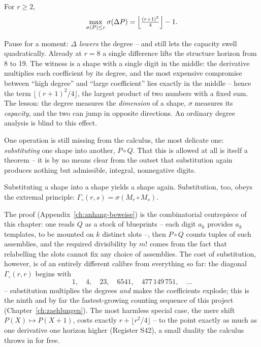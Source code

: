\begin{satz}
For $r\ge2$,
\[
\max_{\sigma(P)\le r}\sigma(\Delta P)
=\Bigl\lfloor\tfrac{(r+1)^2}{4}\Bigr\rfloor-1 .
\]
\end{satz}

Pause for a moment: $\Delta$ \emph{lowers} the degree -- and still
lets the capacity swell quadratically. Already at $r=8$ a single
difference lifts the structure horizon from 8 to 19. The witness
is a shape with a single digit in the middle: the derivative
multiplies each coefficient by its degree, and the most expensive
compromise between ``high degree'' and ``large coefficient'' lies
exactly in the middle -- hence the term
$\lfloor(r{+}1)^2/4\rfloor$, the largest product of two numbers
with a fixed sum. The lesson: the degree measures the
\emph{dimension} of a shape, $\sigma$ measures its
\emph{capacity}, and the two can jump in opposite directions. An
ordinary degree analysis is blind to this effect.

One operation is still missing from the calculus, the most
delicate one: \emph{substituting} one shape into another,
$P\circ Q$. That this is allowed at all is itself a theorem -- it
is by no means clear from the outset that substitution again
produces nothing but admissible, integral, nonnegative digits.

\begin{satz}
Substituting a shape into a shape yields a shape again.
Substitution, too, obeys the extremal principle:
$\Gamma_\circ(r,s)=\sigma(M_r\circ M_s)$.
\end{satz}

The proof (Appendix~\ref{ch:anhang-beweise}) is the combinatorial
centrepiece of this chapter: one reads $Q$ as a stock of
blueprints -- each digit $a_k$ provides $a_k$ templates, to be
mounted on $k$ distinct slots --, then $P\circ Q$ counts tuples
of such assemblies, and the required divisibility by $m!$ comes
from the fact that relabelling the slots cannot fix any choice of
assemblies. The cost of substitution, however, is of an entirely
different calibre from everything so far: the diagonal
$\Gamma_\circ(r,r)$ begins with
\[
1,\quad 4,\quad 23,\quad 6541,\quad 477\,149\,751,\quad\ldots
\]
-- substitution multiplies the degrees \emph{and} makes the
coefficients explode; this is the ninth and by far the
fastest-growing counting sequence of this project
(Chapter~\ref{ch:zaehlungen}). The most harmless special case,
the mere shift $P(X)\mapsto P(X{+}1)$, costs exactly
$r+\lfloor r^2/4\rfloor$ -- to the point exactly as much as one
derivative one horizon higher (Register S42), a small duality the
calculus throws in for free.

